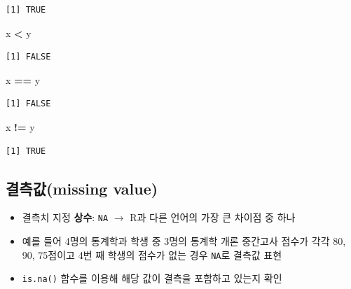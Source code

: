 \documentclass[
  11pt,
]{krantz}
\newenvironment{Shaded}{\begin{snugshade}}{\end{snugshade}}
\newcommand{\NormalTok}[1]{#1}
\newcommand{\OperatorTok}[1]{\textcolor[rgb]{0.43,0.43,0.43}{\textbf{#1}}}
\newcommand{\StringTok}[1]{\textcolor[rgb]{0.5,0.5,0.5}{#1}}
\providecommand{\tightlist}{%
  \setlength{\itemsep}{0pt}\setlength{\parskip}{0pt}}
\begin{document}
\begin{verbatim}
[1] TRUE
\end{verbatim}

\begin{Shaded}
\begin{Highlighting}[]
\NormalTok{x }\OperatorTok{<}\StringTok{ }\NormalTok{y}
\end{Highlighting}
\end{Shaded}

\begin{verbatim}
[1] FALSE
\end{verbatim}

\begin{Shaded}
\begin{Highlighting}[]
\NormalTok{x }\OperatorTok{==}\StringTok{ }\NormalTok{y}
\end{Highlighting}
\end{Shaded}

\begin{verbatim}
[1] FALSE
\end{verbatim}

\begin{Shaded}
\begin{Highlighting}[]
\NormalTok{x }\OperatorTok{!=}\StringTok{ }\NormalTok{y}
\end{Highlighting}
\end{Shaded}

\begin{verbatim}
[1] TRUE
\end{verbatim}

\normalsize

\hypertarget{missing-value}{%
\subsection{결측값(missing value)}\label{missing-value}}

\begin{itemize}
\tightlist
\item
  결측치 지정 \textbf{상수}: \texttt{NA} \(\rightarrow\) R과 다른 언어의 가장 큰 차이점 중 하나
\item
  예를 들어 4명의 통계학과 학생 중 3명의 통계학 개론 중간고사 점수가 각각 80, 90, 75점이고 4번 째 학생의 점수가 없는 경우 \texttt{NA}로 결측값 표현
\item
  \texttt{is.na()} 함수를 이용해 해당 값이 결측을 포함하고 있는지 확인
\end{itemize}

\footnotesize
\end{document}
